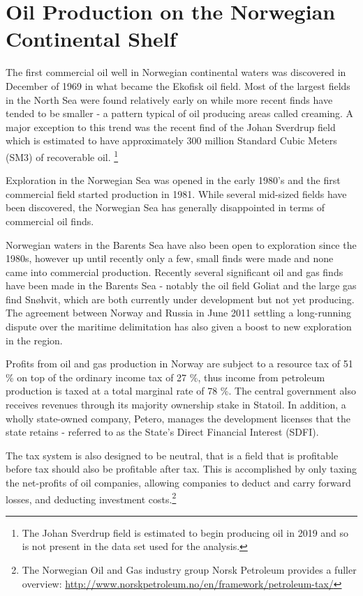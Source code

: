 \documentclass[12pt]{article}
\begin{document}
\section{Oil Production on the Norwegian Continental Shelf}

The first commercial oil well in Norwegian continental waters was discovered in December of 1969 in what became the Ekofisk oil field. Most of the largest fields in the North Sea were found relatively early on while more recent finds have tended to be smaller - a pattern typical of oil producing areas called creaming. A major exception to this trend was the recent find of the Johan Sverdrup field which is estimated to have approximately 300 million Standard Cubic Meters (SM3) of recoverable oil. \footnote{The Johan Sverdrup field is estimated to begin producing oil in 2019 and so is not present in the data set used for the analysis.}

Exploration in the Norwegian Sea was opened in the early 1980’s and the first commercial field started production in 1981.  While several mid-sized fields have been discovered, the Norwegian Sea has generally disappointed in terms of commercial oil finds.  

Norwegian waters in the Barents Sea have also been open to exploration since the 1980s, however up until recently only a few, small finds were made and none came into commercial production.  Recently several significant oil and gas finds have been made in the Barents Sea - notably the oil field Goliat and the large gas find Sn\o hvit, which are both currently under development but not yet producing.  The agreement between Norway and Russia in June 2011 settling a long-running dispute over the maritime delimitation has also given a boost to new exploration in the region.  

Profits from oil and gas production in Norway are subject to a resource tax of 51 \% on top of the ordinary income tax of 27 \%, thus income from petroleum production is taxed at a total marginal rate of 78 \%.  The central government also receives revenues through its majority ownership stake in Statoil. In addition, a wholly state-owned company, Petero, manages the development licenses that the state retains - referred to as the State's Direct Financial Interest (SDFI).

The tax system is also designed to be neutral, that is a field that is profitable before tax should also be profitable after tax. This is accomplished by only taxing the net-profits of oil companies, allowing companies to deduct and carry forward losses, and deducting investment costs.\footnote{The Norwegian Oil and Gas industry group Norsk Petroleum provides a fuller overview: \url{http://www.norskpetroleum.no/en/framework/petroleum-tax/}}
\end{document}
